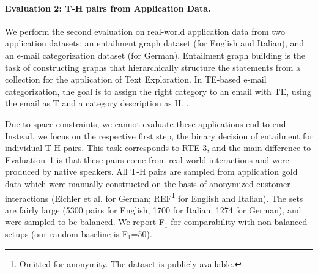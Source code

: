 \documentclass[11pt,a4paper]{article}
\begin{document}
\paragraph{Evaluation 2: T-H pairs from Application Data.}
We perform the second evaluation on real-world application data from
two application datasets: an entailment graph dataset (for English and
Italian), and an e-mail categorization dataset (for German).
Entailment graph building is the task of constructing graphs that
hierarchically structure the statements from a collection
\cite{berant2012learning} for the application of Text Exploration.  In
TE-based e-mail categorization, the goal is to assign the right
category to an email with TE, using the email as T and a category
description as H. \cite{Eichler:2014}.

Due to space constraints, we cannot evaluate these applications
end-to-end. Instead, we focus on the respective first step, the binary
decision of entailment for individual T-H pairs. This task corresponds
to RTE-3, and the main difference to Evaluation~1 is that these pairs
come from real-world interactions and were produced by native
speakers.  All T-H pairs %
are sampled from application gold data which were manually constructed
on the basis of anonymized customer interactions (Eichler et
al.  for German; REF\footnote{Omitted for
  anonymity. The dataset is publicly available.} for English and
Italian). The sets are fairly large (5300 pairs for English, 1700 for
Italian, 1274 for German), and were sampled to be balanced. We report
F$_1$ for comparability with non-balanced setups (our random baseline
is F$_1$=50).


\end{document}
